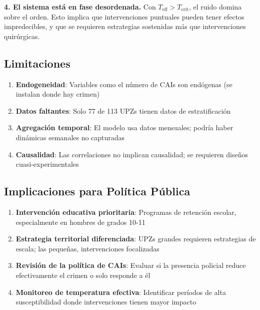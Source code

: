 \documentclass[12pt,a4paper]{article}
\begin{document}
\textbf{4. El sistema está en fase desordenada.} Con $T_{\text{eff}} > T_{\text{crit}}$, el ruido domina sobre el orden. Esto implica que intervenciones puntuales pueden tener efectos impredecibles, y que se requieren estrategias sostenidas más que intervenciones quirúrgicas.

\subsection{Limitaciones}

\begin{enumerate}[label=\alph*)]
    \item \textbf{Endogeneidad}: Variables como el número de CAIs son endógenas (se instalan donde hay crimen)
    \item \textbf{Datos faltantes}: Solo 77 de 113 UPZs tienen datos de estratificación
    \item \textbf{Agregación temporal}: El modelo usa datos mensuales; podría haber dinámicas semanales no capturadas
    \item \textbf{Causalidad}: Las correlaciones no implican causalidad; se requieren diseños cuasi-experimentales
\end{enumerate}

\subsection{Implicaciones para Política Pública}

\begin{enumerate}[label=\alph*)]
    \item \textbf{Intervención educativa prioritaria}: Programas de retención escolar, especialmente en hombres de grados 10-11
    \item \textbf{Estrategia territorial diferenciada}: UPZs grandes requieren estrategias de escala; las pequeñas, intervenciones focalizadas
    \item \textbf{Revisión de la política de CAIs}: Evaluar si la presencia policial reduce efectivamente el crimen o solo responde a él
    \item \textbf{Monitoreo de temperatura efectiva}: Identificar períodos de alta susceptibilidad donde intervenciones tienen mayor impacto
\end{enumerate}

\end{document}
